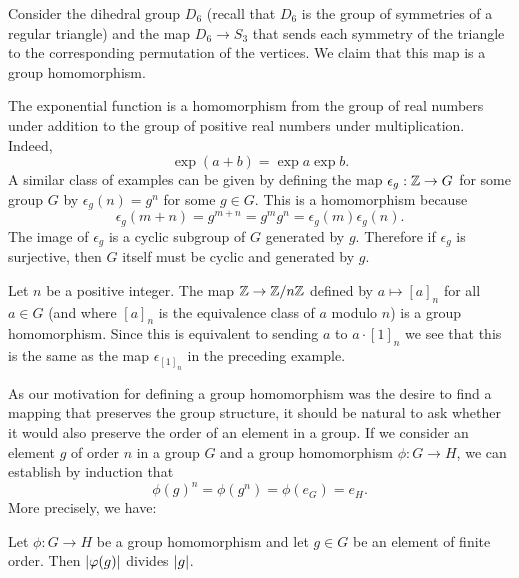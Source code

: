 \begin{example}
    Consider the dihedral group \(D_6\) (recall that \(D_6\) is the group of
    symmetries of a regular triangle) and the map \(D_6 \to S_3\) that sends
    each symmetry of the triangle to the corresponding permutation of the
    vertices. We claim that this map is a group homomorphism.
\end{example}

\begin{example}
    The exponential function is a homomorphism from the group of real numbers
    under addition to the group of positive real numbers under multiplication.
    Indeed,
    \[
        \exp (a + b) = \exp a \exp b.
    \]
    A similar class of examples can be given by defining the map \(\epsilon_g :
    \mathbb{Z} \to G\) for some group \(G\) by \(\epsilon_g(n) = g^n\) for some \(g \in
    G\). This is a homomorphism because
    \[
        \epsilon_g(m + n) = g^{m + n} = g^m g^n = \epsilon_g(m) \epsilon_g(n).
    \]
    The image of \(\epsilon_g\) is a cyclic subgroup of \(G\) generated by
    \(g\). Therefore if \(\epsilon_g\) is surjective, then \(G\) itself must be
    cyclic and generated by \(g\).
\end{example}

\begin{example}
    Let \(n\) be a positive integer. The map \(\mathbb{Z} \to \mathbb{Z}/n\mathbb{Z}\) defined by \(a
    \mapsto [a]_n\) for all \(a \in G\) (and where \([a]_n\) is the equivalence
    class of \(a\) modulo \(n\)) is a group homomorphism. Since this is
    equivalent to sending \(a\) to \(a \cdot [1]_n\) we see that this is the
    same as the map \(\epsilon_{[1]_n}\) in the preceding example.
\end{example}

\begin{remark}
    \label{rem:homomorphism-order}
    As our motivation for defining a group homomorphism was the desire to find a
    mapping that preserves the group structure, it should be natural to ask
    whether it would also preserve the order of an element in a group. If we
    consider an element \(g\) of order \(n\) in a group \(G\) and a group
    homomorphism \(\phi: G \to H\), we can establish by induction that
    \[
        \phi(g)^n = \phi(g^n) = \phi(e_G) = e_H.
    \]
    More precisely, we have:
\end{remark}

\begin{theorem}
    \label{thm:order-divides-n-homomorphism}
    Let \(\phi: G \to H\) be a group homomorphism and let \(g \in G\) be an
    element of finite order. Then \(\lvert \varphi(g) \rvert\) divides \(\lvert g \rvert\).
\end{theorem}

